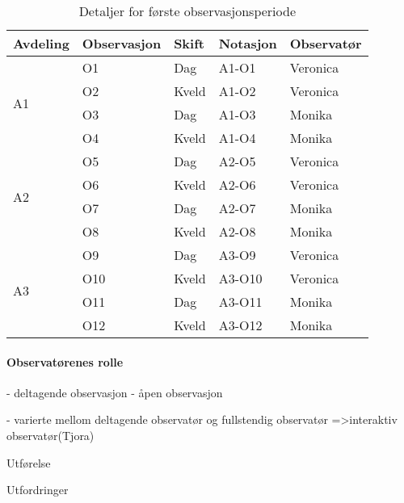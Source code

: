 \begin{table}[H]\centering
    \begin{tabular}{ |l|l|l|l|l| }
    \hline
    Avdeling & Observasjon & Skift & Notasjon & Observatør \\ \hline
 	\multirow{4}{*}{A1} & O1 & Dag & A1-O1 & Veronica \\
 	& O2 & Kveld & A1-O2 & Veronica \\
	& O3 & Dag & A1-O3 & Monika \\
 	& O4 & Kveld & A1-O4 & Monika \\ \hline
   	\multirow{4}{*}{A2} & O5 & Dag & A2-O5 & Veronica \\
 	& O6 & Kveld & A2-O6 & Veronica \\
	& O7 & Dag & A2-O7 & Monika \\
 	& O8 & Kveld & A2-O8 & Monika \\ \hline
 	\multirow{4}{*}{A3} & O9 & Dag & A3-O9 & Veronica \\
 	& O10 & Kveld & A3-O10 & Veronica \\
	& O11 & Dag & A3-O11 & Monika \\
 	& O12 & Kveld & A3-O12 & Monika \\ 
 	\hline
    \end{tabular}
    \caption {Detaljer for første observasjonsperiode}
\end{table}

\paragraph{Observatørenes rolle}





- deltagende observasjon
- åpen observasjon

- varierte mellom deltagende observatør og fullstendig observatør =>interaktiv observatør(Tjora)




Utførelse

Utfordringer
